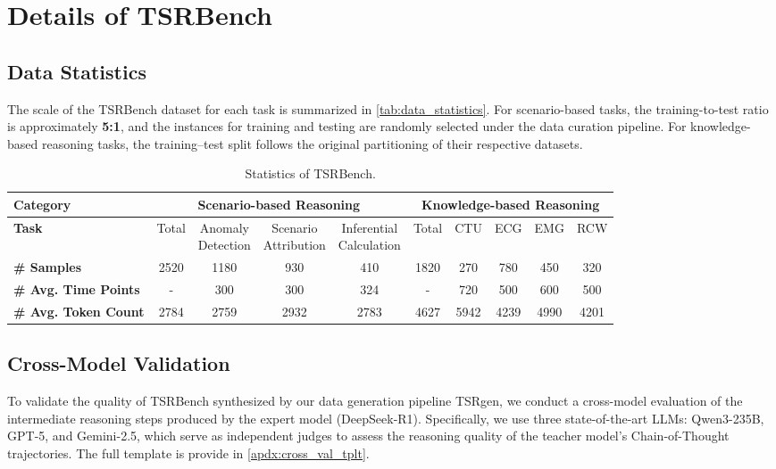 \documentclass{article}
\theoremstyle{plain}
\theoremstyle{definition}
\theoremstyle{remark}
\begin{document}
\section{Details of TSRBench}
\label{apdx:TSRBench_details}

\subsection{Data Statistics}
\label{apdx:data_statistics}

The scale of the TSRBench dataset for each task is summarized in \autoref{tab:data_statistics}. For scenario-based tasks, the training-to-test ratio is approximately \textbf{5:1}, and the instances for training and testing are randomly selected under the data curation pipeline. For knowledge-based reasoning tasks, the training–test split follows the original partitioning of their respective datasets.

\begin{table}[htbp]
\caption{Statistics of TSRBench.}
\centering
\small
\label{tab:data_statistics}
\begin{tabular}{lcccc|ccccc}
\toprule
\textbf{Category} & \multicolumn{4}{c}{\textbf{Scenario-based Reasoning}} & 
 \multicolumn{5}{c}{\textbf{Knowledge-based Reasoning}} \\
\midrule
\textbf{Task} & Total & \makecell{Anomaly\\Detection} & \makecell{Scenario\\Attribution} & \makecell{Inferential\\Calculation} & Total & CTU & ECG & EMG & RCW \\
\midrule
\textbf{\# Samples} & 2520 & 1180 & 930 & 410 & 1820 & 270 & 780 & 450 & 320 \\
\textbf{\# Avg. Time Points} & - & 300 & 300 & 324 & - & 720 & 500 & 600 & 500 \\
\textbf{\# Avg. Token Count} & 2784 & 2759 & 2932 & 2783 & 4627 & 5942 & 4239 & 4990 & 4201 \\
\bottomrule
\end{tabular}
\end{table}


\subsection{Cross-Model Validation}
\label{apdx:cross_val}

To validate the quality of TSRBench synthesized by our data generation pipeline TSRgen, we conduct a cross-model evaluation of the intermediate reasoning steps produced by the expert model (DeepSeek-R1). Specifically, we use three state-of-the-art LLMs: Qwen3-235B, GPT-5, and Gemini-2.5, which serve as independent judges to assess the reasoning quality of the teacher model's Chain-of-Thought trajectories. The full template is provide in \autoref{apdx:cross_val_tplt}.
\end{document}
